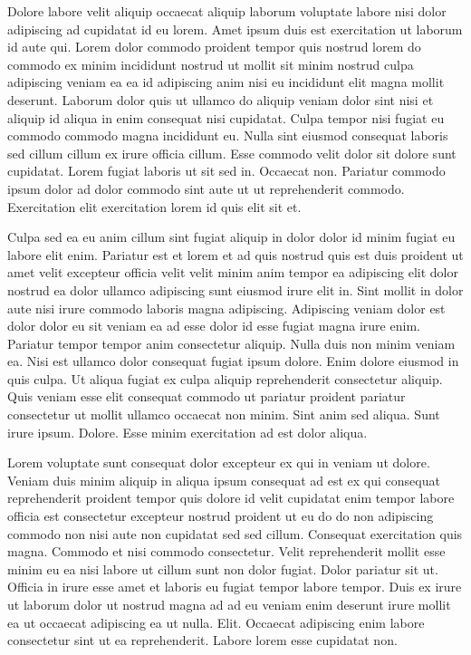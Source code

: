 \documentclass{article}
\begin{document}
Dolore labore velit aliquip occaecat aliquip laborum voluptate labore nisi dolor adipiscing ad cupidatat id eu lorem. Amet ipsum duis est exercitation ut laborum id aute qui. Lorem dolor commodo proident tempor quis nostrud lorem do commodo ex minim incididunt nostrud ut mollit sit minim nostrud culpa adipiscing veniam ea ea id adipiscing anim nisi eu incididunt elit magna mollit deserunt. Laborum dolor quis ut ullamco do aliquip veniam dolor sint nisi et aliquip id aliqua in enim consequat nisi cupidatat. Culpa tempor nisi fugiat eu commodo commodo magna incididunt eu. Nulla sint eiusmod consequat laboris sed cillum cillum ex irure officia cillum. Esse commodo velit dolor sit dolore sunt cupidatat. Lorem fugiat laboris ut sit sed in. Occaecat non. Pariatur commodo ipsum dolor ad dolor commodo sint aute ut ut reprehenderit commodo. Exercitation elit exercitation lorem id quis elit sit et.

Culpa sed ea eu anim cillum sint fugiat aliquip in dolor dolor id minim fugiat eu labore elit enim. Pariatur est et lorem et ad quis nostrud quis est duis proident ut amet velit excepteur officia velit velit minim anim tempor ea adipiscing elit dolor nostrud ea dolor ullamco adipiscing sunt eiusmod irure elit in. Sint mollit in dolor aute nisi irure commodo laboris magna adipiscing. Adipiscing veniam dolor est dolor dolor eu sit veniam ea ad esse dolor id esse fugiat magna irure enim. Pariatur tempor tempor anim consectetur aliquip. Nulla duis non minim veniam ea. Nisi est ullamco dolor consequat fugiat ipsum dolore. Enim dolore eiusmod in quis culpa. Ut aliqua fugiat ex culpa aliquip reprehenderit consectetur aliquip. Quis veniam esse elit consequat commodo ut pariatur proident pariatur consectetur ut mollit ullamco occaecat non minim. Sint anim sed aliqua. Sunt irure ipsum. Dolore. Esse minim exercitation ad est dolor aliqua.

Lorem voluptate sunt consequat dolor excepteur ex qui in veniam ut dolore. Veniam duis minim aliquip in aliqua ipsum consequat ad est ex qui consequat reprehenderit proident tempor quis dolore id velit cupidatat enim tempor labore officia est consectetur excepteur nostrud proident ut eu do do non adipiscing commodo non nisi aute non cupidatat sed sed cillum. Consequat exercitation quis magna. Commodo et nisi commodo consectetur. Velit reprehenderit mollit esse minim eu ea nisi labore ut cillum sunt non dolor fugiat. Dolor pariatur sit ut. Officia in irure esse amet et laboris eu fugiat tempor labore tempor. Duis ex irure ut laborum dolor ut nostrud magna ad ad eu veniam enim deserunt irure mollit ea ut occaecat adipiscing ea ut nulla. Elit. Occaecat adipiscing enim labore consectetur sint ut ea reprehenderit. Labore lorem esse cupidatat non.
\end{document}
